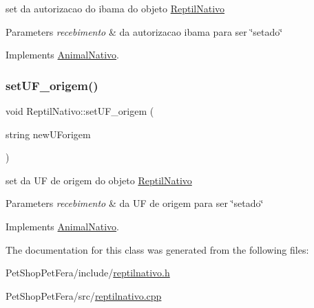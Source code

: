 set da autorizacao do ibama do objeto \mbox{\hyperlink{class_reptil_nativo}{Reptil\+Nativo}} 


\begin{DoxyParams}{Parameters}
{\em recebimento} & da autorizacao ibama para ser \char`\"{}setado\char`\"{} \\
\hline
\end{DoxyParams}


Implements \mbox{\hyperlink{class_animal_nativo_a1af7e01f35c5df788dd898136975eb49}{Animal\+Nativo}}.

\mbox{\label{class_reptil_nativo_a3a49bb2babda8f742bb1d0cda11c6dec}} 
\subsubsection{\texorpdfstring{setUF\_origem()}{setUF\_origem()}}
{\footnotesize\ttfamily void Reptil\+Nativo\+::set\+U\+F\+\_\+origem (\begin{DoxyParamCaption}\item[{string}]{new\+U\+Forigem }\end{DoxyParamCaption})\hspace{0.3cm}{\ttfamily [virtual]}}



set da UF de origem do objeto \mbox{\hyperlink{class_reptil_nativo}{Reptil\+Nativo}} 


\begin{DoxyParams}{Parameters}
{\em recebimento} & da UF de origem para ser \char`\"{}setado\char`\"{} \\
\hline
\end{DoxyParams}


Implements \mbox{\hyperlink{class_animal_nativo}{Animal\+Nativo}}.



The documentation for this class was generated from the following files\+:\begin{DoxyCompactItemize}
\item 
Pet\+Shop\+Pet\+Fera/include/\mbox{\hyperlink{reptilnativo_8h}{reptilnativo.\+h}}\item 
Pet\+Shop\+Pet\+Fera/src/\mbox{\hyperlink{reptilnativo_8cpp}{reptilnativo.\+cpp}}\end{DoxyCompactItemize}

